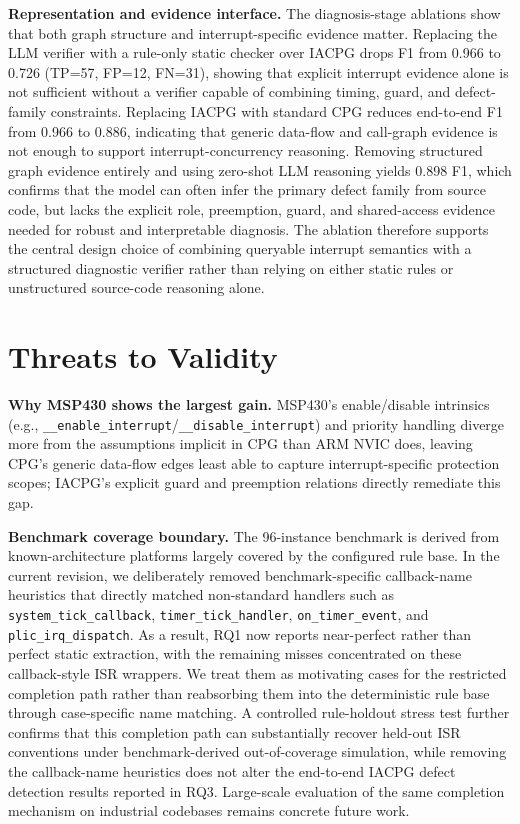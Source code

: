 \documentclass[conference]{IEEEtran}
\begin{document}
\textbf{Representation and evidence interface.} The diagnosis-stage ablations show that both graph structure and interrupt-specific evidence matter. Replacing the LLM verifier with a rule-only static checker over IACPG drops F1 from 0.966 to 0.726 (TP=57, FP=12, FN=31), showing that explicit interrupt evidence alone is not sufficient without a verifier capable of combining timing, guard, and defect-family constraints. Replacing IACPG with standard CPG reduces end-to-end F1 from 0.966 to 0.886, indicating that generic data-flow and call-graph evidence is not enough to support interrupt-concurrency reasoning. Removing structured graph evidence entirely and using zero-shot LLM reasoning yields 0.898 F1, which confirms that the model can often infer the primary defect family from source code, but lacks the explicit role, preemption, guard, and shared-access evidence needed for robust and interpretable diagnosis. The ablation therefore supports the central design choice of combining queryable interrupt semantics with a structured diagnostic verifier rather than relying on either static rules or unstructured source-code reasoning alone.

\FloatBarrier

\section{Threats to Validity}


\textbf{Why MSP430 shows the largest gain.} MSP430's enable/disable intrinsics (e.g., \texttt{\_\_enable\_interrupt}/\texttt{\_\_disable\_interrupt}) and priority handling diverge more from the assumptions implicit in CPG than ARM NVIC does, leaving CPG's generic data-flow edges least able to capture interrupt-specific protection scopes; IACPG's explicit guard and preemption relations directly remediate this gap.

\textbf{Benchmark coverage boundary.} The 96-instance benchmark is derived from known-architecture platforms largely covered by the configured rule base. In the current revision, we deliberately removed benchmark-specific callback-name heuristics that directly matched non-standard handlers such as \texttt{system\_tick\_callback}, \texttt{timer\_tick\_handler}, \texttt{on\_timer\_event}, and \texttt{plic\_irq\_dispatch}. As a result, RQ1 now reports near-perfect rather than perfect static extraction, with the remaining misses concentrated on these callback-style ISR wrappers. We treat them as motivating cases for the restricted completion path rather than reabsorbing them into the deterministic rule base through case-specific name matching. A controlled rule-holdout stress test further confirms that this completion path can substantially recover held-out ISR conventions under benchmark-derived out-of-coverage simulation, while removing the callback-name heuristics does not alter the end-to-end IACPG defect detection results reported in RQ3. Large-scale evaluation of the same completion mechanism on industrial codebases remains concrete future work.
\end{document}
